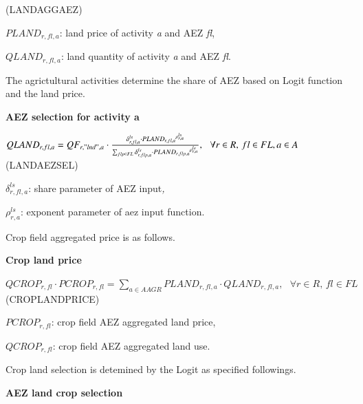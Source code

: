 \documentclass[10pt,a4paper,titlepage,dvipdfmx]{book}
\begin{document}
\begin{flushright}(LANDAGGAEZ) \end{flushright}

\begin{flushleft}
$PLAND_{r,fl,a}$: land price of activity \textit{a} and AEZ \textit{fl},

$QLAND_{r,fl,a}$: land quantity of activity \textit{a} and AEZ \textit{fl}.
\end{flushleft}

The agrictultural activities determine the share of AEZ based on Logit function and the land price.

\begin{flushleft}\textbf{AEZ selection for activity a}\end{flushleft}


\begin{center}$QLAND_{r,fl,a}=QF_{r,"lnd",a}\cdot \frac{\delta _{r,fl,a}^{ls}\cdot PLAN{D_{r,fl,a}}^{\rho _{r,a}^{ls}}}{\sum _{flp\in FL}\delta _{r,flp,a}^{ls}\cdot PLAN{D_{r,flp,a}}^{\rho _{r,a}^{ls}}},\,\,\,\,\forall r\in R,\,fl\in FL,a\in A$ (LANDAEZSEL)
\end{center}

\begin{flushleft}
$\delta _{r,fl,a}^{ls}$: share parameter of AEZ input\textit{,}

$\rho _{r,a}^{ls}$: exponent parameter of aez input function.
\end{flushleft}

Crop field aggregated price is as follows.

\begin{flushleft}\textbf{Crop land price}\end{flushleft}


\begin{center}$QCROP_{r,fl}\cdot PCROP_{r,fl}=\sum _{a\in AAGR}PLAND_{r,fl,a}\cdot QLAND_{r,fl,a},\,\,\,\,\forall r\in R,\,fl\in FL$ (CROPLANDPRICE)
\end{center}

\begin{flushleft}
$PCROP_{r,fl}$: crop field AEZ aggregated land price,

$QCROP_{r,fl}$: crop field AEZ aggregated land use.
\end{flushleft}

Crop land selection is detemined by the Logit as specified followings.

\begin{flushleft}\textbf{AEZ land crop selection}\end{flushleft}
\end{document}
